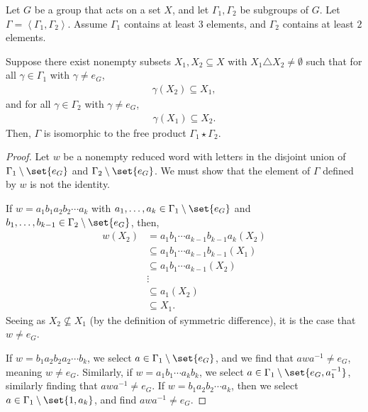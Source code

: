 \begin{theorem}
  Let $G$ be a group that acts on a set $X$, and let $\Gamma_1,\Gamma_2$ be subgroups of $G$. Let $\Gamma = \left\langle \Gamma_1,\Gamma_2 \right\rangle$. Assume $\Gamma_1$ contains at least $3$ elements, and $\Gamma_2$ contains at least $2$ elements.\newline

  Suppose there exist nonempty subsets $X_1,X_2\subseteq X$ with $X_1\triangle X_2 \neq \emptyset$ such that for all $\gamma\in \Gamma_1$ with $\gamma \neq e_{G}$,
  \begin{align*}
    \gamma\left(X_2\right)\subseteq X_1,
  \end{align*}
  and for all $\gamma \in \Gamma_2$ with $\gamma \neq e_G$,
  \begin{align*}
    \gamma\left(X_1\right)\subseteq X_2.
  \end{align*}
  Then, $\Gamma$ is isomorphic to the free product $\Gamma_1\star \Gamma_2$.\label{thm:ping_pong}
\end{theorem}
\begin{proof}
  Let $w$ be a nonempty reduced word with letters in the disjoint union of $\Gamma_1\setminus \set{e_G}$ and $\Gamma_2\setminus \set{e_G}$. We must show that the element of $\Gamma$ defined by $w$ is not the identity.\newline

  If $w = a_1b_1a_2b_2\cdots a_k$ with $a_1,\dots,a_k\in \Gamma_1\setminus \set{e_G}$ and $b_1,\dots,b_{k-1}\in \Gamma_{2}\setminus \set{e_G}$, then,
  \begin{align*}
    w\left(X_2\right) &= a_1b_1\cdots a_{k-1}b_{k-1}a_k\left(X_2\right)\\
                      &\subseteq a_1b_1\cdots a_{k-1}b_{k-1}\left(X_1\right)\\
                      &\subseteq a_1b_1\cdots a_{k-1}\left(X_2\right)\\
                      &\vdots\\
                      &\subseteq a_1\left(X_2\right)\\
                      &\subseteq X_1.
  \end{align*}
  Seeing as $X_2\nsubseteq X_1$ (by the definition of symmetric difference), it is the case that $w\neq e_{G}$.\newline

  If $w = b_1a_2b_2a_2\cdots b_k$, we select $a\in \Gamma_1\setminus \set{e_G}$, and we find that $awa^{-1}\neq e_G$, meaning $w\neq e_G$. Similarly, if $w = a_1b_1\cdots a_kb_k$, we select $a\in \Gamma_1\setminus \set{e_G,a_{1}^{-1}}$, similarly finding that $awa^{-1}\neq e_{G}$. If $w = b_1a_2b_2\cdots a_k$, then we select $a\in \Gamma_1\setminus \set{1,a_k}$, and find $awa^{-1}\neq e_G$.
\end{proof}


